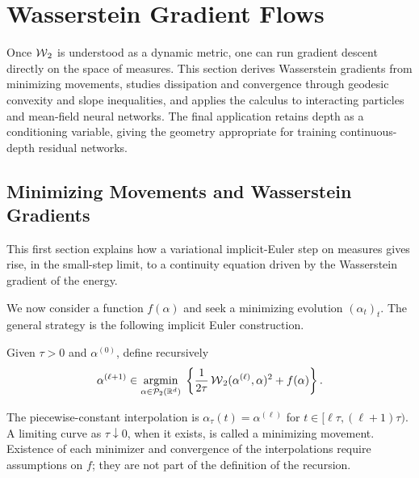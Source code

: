 
\section{Wasserstein Gradient Flows}
\label{sec-wasserstein-gradient-flows}

Once $\operatorname{\mathcal{W}}_2$ is understood as a dynamic metric, one can run gradient descent directly on the space of measures. This section derives Wasserstein gradients from minimizing movements, studies dissipation and convergence through geodesic convexity and slope inequalities, and applies the calculus to interacting particles and mean-field neural networks. The final application retains depth as a conditioning variable, giving the geometry appropriate for training continuous-depth residual networks.

\subsection{Minimizing Movements and Wasserstein Gradients}

This first section explains how a variational implicit-Euler step on measures gives rise, in the small-step limit, to a continuity equation driven by the Wasserstein gradient of the energy.

We now consider a function $f(\alpha)$ and seek a minimizing evolution $(\alpha_t)_t$. The general strategy is the following implicit Euler construction.
\begin{defn}\label{def-jko-minimizing-movement}
Given $\tau>0$ and $\alpha^{(0)}$, define recursively
\begin{equation}
    \alpha^{(\ell+1)} \in \underset{\alpha\in\mathcal{P}_2(\mathbb{R}^d)}{\operatorname{argmin}}\;
    \left\{\frac{1}{2 \tau} \operatorname{\mathcal{W}}_2(\alpha^{(\ell)}, \alpha)^2 + f(\alpha)\right\}. \label{eq:jko-discr}
\end{equation}
\end{defn}
The piecewise-constant interpolation is $\alpha_\tau(t)=\alpha^{(\ell)}$ for $t\in[\ell\tau,(\ell+1)\tau)$. A limiting curve as $\tau\downarrow0$, when it exists, is called a minimizing movement. Existence of each minimizer and convergence of the interpolations require assumptions on $f$; they are not part of the definition of the recursion.


